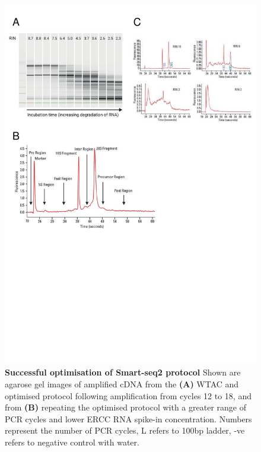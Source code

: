 \begin{figure}[!htp]
	\begin{center}
		\includegraphics[page=5,trim={0 23cm 0 0cm},clip,scale = 0.65]{Figures/General_Methodology_Figures.pdf}
	\end{center}
	\captionsetup{width=0.95\textwidth}
	\caption[Successful optimisation of Smart-seq2 protocol]%
	{\textbf{Successful optimisation of Smart-seq2 protocol} Shown are agarose gel images of amplified cDNA from the  \textbf{(A)} WTAC and optimised protocol following amplification from cycles 12 to 18, and from \textbf{(B)} repeating the optimised protocol with a greater range of PCR cycles and lower ERCC RNA spike-in concentration. Numbers represent the number of PCR cycles, L refers to 100bp ladder, -ve refers to negative control with water.}
	\label{fig:wtac_optimised_gel1_2}
\end{figure}


